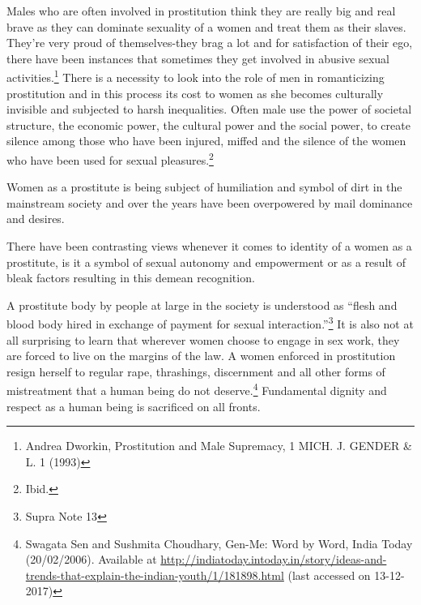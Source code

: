 \begin{multicols}{2}
\vspace{-.15cm}

\noi
Males who are often involved in prostitution think they are really big and real brave as they
can dominate sexuality of a women and treat them as their slaves. They're very proud of themselves-they brag a lot and for satisfaction of their ego, there have been instances that
sometimes they get involved in abusive sexual activities.\footnote{Andrea Dworkin, Prostitution and Male Supremacy, 1 MICH. J. GENDER \& L. 1 (1993)} There is a necessity to look into the
role of men in romanticizing prostitution and in this process its cost to women as she becomes
culturally invisible and subjected to harsh inequalities. Often male use the power of societal
structure, the economic power, the cultural power and the social power, to create silence among
those who have been injured, miffed and the silence of the women who have been used for
sexual pleasures.\footnote{Ibid.}

\vspace{-.15cm}

\noi
Women as a prostitute is being subject of humiliation and symbol of dirt in the mainstream
society and over the years have been overpowered by mail dominance and desires.

\vspace{-.15cm}


\vspace{-.15cm}

\noi
There have been contrasting views whenever it comes to identity of a women as a prostitute, is
it a symbol of sexual autonomy and empowerment or as a result of bleak factors resulting in
this demean recognition.

\noi
A prostitute body by people at large in the society is understood as “flesh and blood body hired
in exchange of payment for sexual interaction.”\footnote{Supra Note 13} It is also not at all surprising to learn that
wherever women choose to engage in sex work, they are forced to live on the margins of the
law. A women enforced in prostitution resign herself to regular rape, thrashings, discernment
and all other forms of mistreatment that a human being do not deserve.\footnote{Swagata Sen and Sushmita Choudhary, Gen-Me: Word by Word, India Today (20/02/2006). Available at \url{http://indiatoday.intoday.in/story/ideas-and-trends-that-explain-the-indian-youth/1/181898.html} (last accessed on 13-12-2017)} Fundamental dignity
and respect as a human being is sacrificed on all fronts.


\end{multicols}
